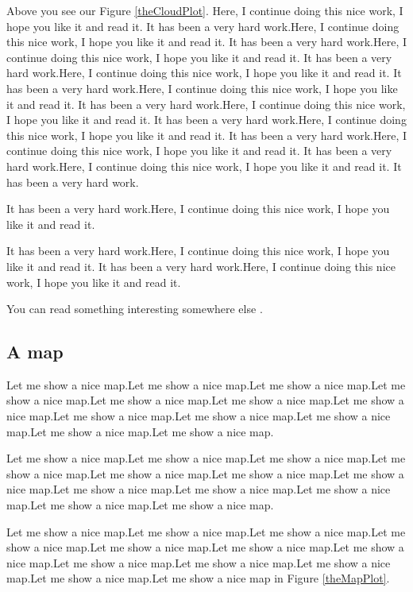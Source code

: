 \documentclass[11pt]{article}
\begin{document}
Above you see our Figure \ref{theCloudPlot}. Here, I continue doing this nice work, I hope you like it and read it. It has been a very hard work.Here, I continue doing this nice work, I hope you like it and read it. It has been a very hard work.Here, I continue doing this nice work, I hope you like it and read it. It has been a very hard work.Here, I continue doing this nice work, I hope you like it and read it. It has been a very hard work.Here, I continue doing this nice work, I hope you like it and read it. It has been a very hard work.Here, I continue doing this nice work, I hope you like it and read it. It has been a very hard work.Here, I continue doing this nice work, I hope you like it and read it. It has been a very hard work.Here, I continue doing this nice work, I hope you like it and read it. It has been a very hard work.Here, I continue doing this nice work, I hope you like it and read it. It has been a very hard work.

It has been a very hard work.Here, I continue doing this nice work, I hope you like it and read it.

It has been a very hard work.Here, I continue doing this nice work, I hope you like it and read it. It has been a very hard work.Here, I continue doing this nice work, I hope you like it and read it. 

You can read something interesting somewhere else \citep{lipman_art_2022}.

\subsection{A map}\label{mapPlot}

Let me show a nice map.Let me show a nice map.Let me show a nice map.Let me show a nice map.Let me show a nice map.Let me show a nice map.Let me show a nice map.Let me show a nice map.Let me show a nice map.Let me show a nice map.Let me show a nice map.Let me show a nice map.

Let me show a nice map.Let me show a nice map.Let me show a nice map.Let me show a nice map.Let me show a nice map.Let me show a nice map.Let me show a nice map.Let me show a nice map.Let me show a nice map.Let me show a nice map.Let me show a nice map.Let me show a nice map.

Let me show a nice map.Let me show a nice map.Let me show a nice map.Let me show a nice map.Let me show a nice map.Let me show a nice map.Let me show a nice map.Let me show a nice map.Let me show a nice map.Let me show a nice map.Let me show a nice map.Let me show a nice map in Figure \ref{theMapPlot}.
\end{document}
